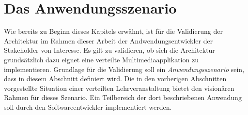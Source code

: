 

% 
% 



\section{Das Anwendungsszenario} %
\label{sub:das_anwendungsszenario}

  Wie bereits zu Beginn dieses Kapitels erwähnt, ist für die Validierung der Architektur im Rahmen dieser Arbeit der Andwendungsentwickler der Stakeholder von Interesse. Es gilt zu validieren, ob sich die Architektur grundsätzlich dazu eignet eine verteilte Multimediaapplikation zu implementieren. Grundlage für die Validierung soll ein \emph{Anwendungsszenario} sein, dass in diesem Abschnitt definiert wird. Die in den vorherigen Abschnitten vorgestellte Situation einer verteilten Lehrveranstaltung bietet den visionären Rahmen für dieses Szenario. Ein Teilbereich der dort beschriebenen Anwendung soll durch den Softwareentwickler implementiert werden.



